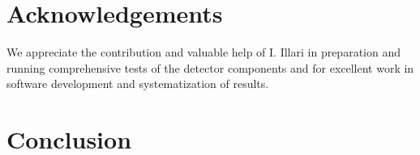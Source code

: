 \section{Acknowledgements}

\indent We appreciate the contribution and valuable help of I. Illari in preparation and running comprehensive tests of the detector components and for excellent work in software development and systematization of results.
\section{Conclusion}



